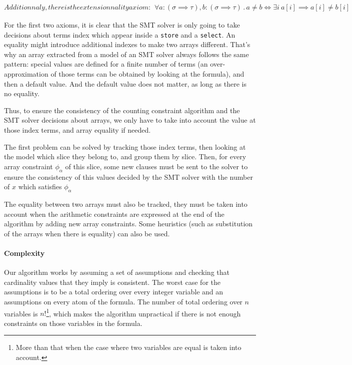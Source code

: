 \documentclass[]{article}
\begin{document}
{\begin{subequations}
    Additionnaly, there is the extensionnality axiom:

    \begin{align}
        \forall a:(\sigma \implies \tau), b:(\sigma \implies \tau)\, .\, a \neq b \iff \exists i\: a[i] \implies a[i] \neq b[i]
    \end{align}
\end{subequations}

For the first two axioms, it is clear that the SMT solver is only going
to take decisions about terms index which appear inside a \texttt{store}
and a \texttt{select}. An equality might introduce additional indexes to
make two arrays different. That's why an array extracted from a model of
an SMT solver always follows the same pattern: special values are
defined for a finite number of terms (an over-approximation of those
terms can be obtained by looking at the formula), and then a default
value. And the default value does not matter, as long as there is no
equality.

Thus, to ensure the consistency of the counting constraint algorithm and
the SMT solver decisions about arrays, we only have to take into account
the value at those index terms, and array equality if needed.

The first problem can be solved by tracking those index terms, then
looking at the model which slice they belong to, and group them by
slice. Then, for every array constraint $\phi_\alpha$ of this slice,
some new clauses must be sent to the solver to ensure the consistency of
this values decided by the SMT solver with the number of $x$ which
satisfies $\phi_\alpha$

The equality between two arrays must also be tracked, they must be taken
into account when the arithmetic constraints are expressed at the end of
the algorithm by adding new array constraints. Some heuristics (such as
substitution of the arrays when there is equality) can also be used.


\paragraph{Complexity}

Our algorithm works by assuming a set of assumptions and checking that
cardinality values that they imply is consistent. The worst case for the
assumptions is to be a total ordering over every integer variable and an
assumptions on every atom of the formula. The number of total ordering
over $n$ variables is
$n!$\footnote{More than that when the case where two variables are equal is taken into account.},
which makes the algorithm unpractical if there is not enough constraints
on those variables in the formula.

}
\end{document}
